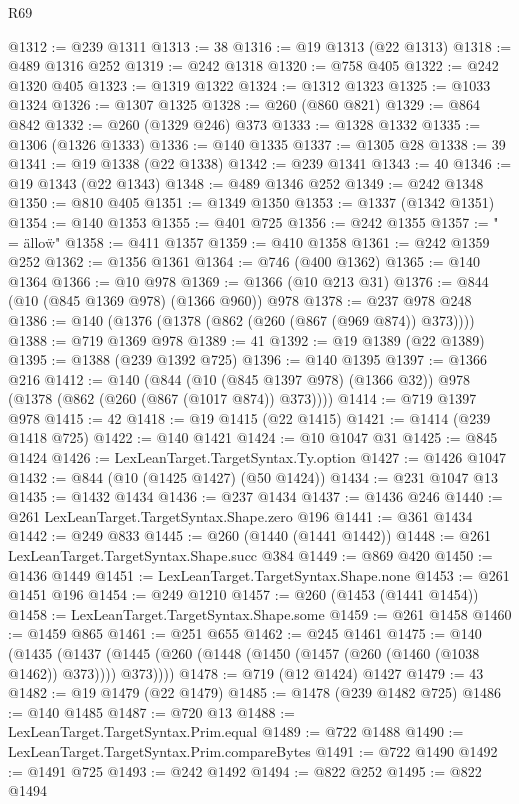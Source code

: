 \begin{lexlean}{R69}
\begin{coremodule}
@1312 := @239 @1311
@1313 := 38
@1316 := @19 @1313 (@22 @1313)
@1318 := @489 @1316 @252
@1319 := @242 @1318
@1320 := @758 @405
@1322 := @242 @1320 @405
@1323 := @1319 @1322
@1324 := @1312 @1323
@1325 := @1033 @1324
@1326 := @1307 @1325
@1328 := @260 (@860 @821)
@1329 := @864 @842
@1332 := @260 (@1329 @246) @373
@1333 := @1328 @1332
@1335 := @1306 (@1326 @1333)
@1336 := @140 @1335
@1337 := @1305 @28
@1338 := 39
@1341 := @19 @1338 (@22 @1338)
@1342 := @239 @1341
@1343 := 40
@1346 := @19 @1343 (@22 @1343)
@1348 := @489 @1346 @252
@1349 := @242 @1348
@1350 := @810 @405
@1351 := @1349 @1350
@1353 := @1337 (@1342 @1351)
@1354 := @140 @1353
@1355 := @401 @725
@1356 := @242 @1355
@1357 := " = \"allow\"\n"
@1358 := @411 @1357
@1359 := @410 @1358
@1361 := @242 @1359 @252
@1362 := @1356 @1361
@1364 := @746 (@400 @1362)
@1365 := @140 @1364
@1366 := @10 @978
@1369 := @1366 (@10 @213 @31)
@1376 := @844 (@10 (@845 @1369 @978) (@1366 @960)) @978
@1378 := @237 @978 @248
@1386 := @140 (@1376 (@1378 (@862 (@260 (@867 (@969 @874)) @373))))
@1388 := @719 @1369 @978
@1389 := 41
@1392 := @19 @1389 (@22 @1389)
@1395 := @1388 (@239 @1392 @725)
@1396 := @140 @1395
@1397 := @1366 @216
@1412 := @140
    (@844 (@10 (@845 @1397 @978) (@1366 @32)) @978 (@1378 (@862 (@260 (@867 (@1017 @874)) @373))))
@1414 := @719 @1397 @978
@1415 := 42
@1418 := @19 @1415 (@22 @1415)
@1421 := @1414 (@239 @1418 @725)
@1422 := @140 @1421
@1424 := @10 @1047 @31
@1425 := @845 @1424
@1426 := LexLeanTarget.TargetSyntax.Ty.option
@1427 := @1426 @1047
@1432 := @844 (@10 (@1425 @1427) (@50 @1424))
@1434 := @231 @1047 @13
@1435 := @1432 @1434
@1436 := @237 @1434
@1437 := @1436 @246
@1440 := @261 LexLeanTarget.TargetSyntax.Shape.zero @196
@1441 := @361 @1434
@1442 := @249 @833
@1445 := @260 (@1440 (@1441 @1442))
@1448 := @261 LexLeanTarget.TargetSyntax.Shape.succ @384
@1449 := @869 @420
@1450 := @1436 @1449
@1451 := LexLeanTarget.TargetSyntax.Shape.none
@1453 := @261 @1451 @196
@1454 := @249 @1210
@1457 := @260 (@1453 (@1441 @1454))
@1458 := LexLeanTarget.TargetSyntax.Shape.some
@1459 := @261 @1458
@1460 := @1459 @865
@1461 := @251 @655
@1462 := @245 @1461
@1475 := @140
    (@1435 (@1437 (@1445 (@260 (@1448 (@1450 (@1457 (@260 (@1460 (@1038 @1462)) @373)))) @373))))
@1478 := @719 (@12 @1424) @1427
@1479 := 43
@1482 := @19 @1479 (@22 @1479)
@1485 := @1478 (@239 @1482 @725)
@1486 := @140 @1485
@1487 := @720 @13
@1488 := LexLeanTarget.TargetSyntax.Prim.equal
@1489 := @722 @1488
@1490 := LexLeanTarget.TargetSyntax.Prim.compareBytes
@1491 := @722 @1490
@1492 := @1491 @725
@1493 := @242 @1492
@1494 := @822 @252
@1495 := @822 @1494

\end{coremodule}
\end{lexlean}
